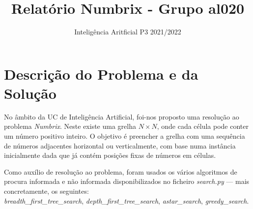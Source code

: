 \documentclass[12pt]{exam}
\title{Relatório Numbrix - Grupo al020}
\author{Inteligência Aritficial P3 2021/2022}
\date{}
\begin{document}
    \maketitle
    \vspace{-3.5em}
    \section{Descrição do Problema e da Solução}
        \indent No âmbito da UC de Inteligência Artificial, foi-nos proposto uma resolução ao problema \textit{Numbrix}.
        Neste existe uma grelha \textbf{$N\times N$}, onde cada célula pode conter um número positivo inteiro.
        O objetivo é preencher a grelha com uma sequência de números adjacentes horizontal ou verticalmente, com base numa instância inicialmente
        dada que já contém posições fixas de números em células.

        \indent Como auxílio de resolução ao problema, foram usados os vários algoritmos de procura informada e não informada disponibilizados no ficheiro \textit{search.py} — mais concretamente, os seguintes: \\
        \textit{breadth\_first\_tree\_search}, \textit{depth\_first\_tree\_search}, \textit{astar\_search}, \textit{greedy\_search}.
\end{document}
